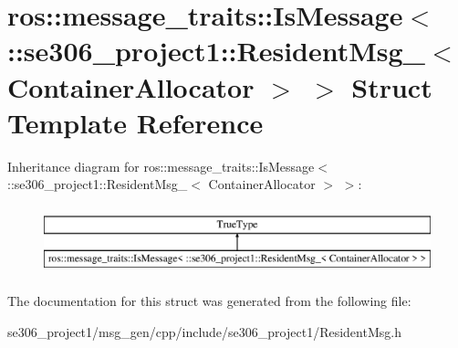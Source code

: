 \hypertarget{structros_1_1message__traits_1_1IsMessage_3_01_1_1se306__project1_1_1ResidentMsg___3_01ContainerAllocator_01_4_01_4}{\section{ros\-:\-:message\-\_\-traits\-:\-:Is\-Message$<$ \-:\-:se306\-\_\-project1\-:\-:Resident\-Msg\-\_\-$<$ Container\-Allocator $>$ $>$ Struct Template Reference}
\label{structros_1_1message__traits_1_1IsMessage_3_01_1_1se306__project1_1_1ResidentMsg___3_01ContainerAllocator_01_4_01_4}
}
Inheritance diagram for ros\-:\-:message\-\_\-traits\-:\-:Is\-Message$<$ \-:\-:se306\-\_\-project1\-:\-:Resident\-Msg\-\_\-$<$ Container\-Allocator $>$ $>$\-:\begin{figure}[H]
\begin{center}
\leavevmode
\includegraphics[height=2.000000cm]{structros_1_1message__traits_1_1IsMessage_3_01_1_1se306__project1_1_1ResidentMsg___3_01ContainerAllocator_01_4_01_4}
\end{center}
\end{figure}


The documentation for this struct was generated from the following file\-:\begin{DoxyCompactItemize}
\item 
se306\-\_\-project1/msg\-\_\-gen/cpp/include/se306\-\_\-project1/Resident\-Msg.\-h\end{DoxyCompactItemize}
